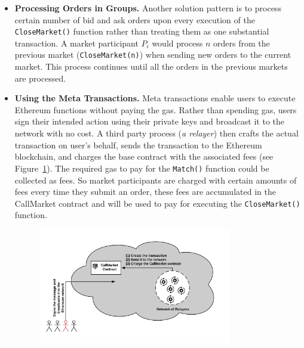 \begin{itemize}
\begin{itemize}
\item \textbf{Processing Orders in Groups.} Another solution pattern is to process certain number of bid and ask orders upon every execution of the \texttt{CloseMarket()} function rather than treating them as one substantial transaction. A market participant $P_i$ would process $n$ orders from the previous market (\texttt{CloseMarket(n)}) when sending new orders to the current market. This process continues until all the orders in the previous markets are processed. %

\item \textbf {Using the Meta Transactions.} Meta transactions enable users to execute Ethereum functions without paying the gas. Rather than spending gas, users sign their intended action using their private keys and broadcast it to the network with no cost. A third party process (\textit{a relayer}) then crafts the actual transaction on user's behalf, sends the transaction to the Ethereum blockchain, and charges the base contract with the associated fees (see Figure~\ref{fig:meta_tx}). The required gas to pay for the \texttt{Match()} function could be collected as fees. So market participants are charged with certain amounts of fees every time they submit an order, these fees are accumulated in the CallMarket contract and will be used to pay for executing the \texttt{CloseMarket()} function.


\begin{figure}[htb!p]
\centering
\includegraphics[width=0.8\textwidth]{fig/meta_tx.png}
\caption{\footnotesize{}  \label{fig:meta_tx}}
\end{figure}



\end{itemize}
\end{itemize}
